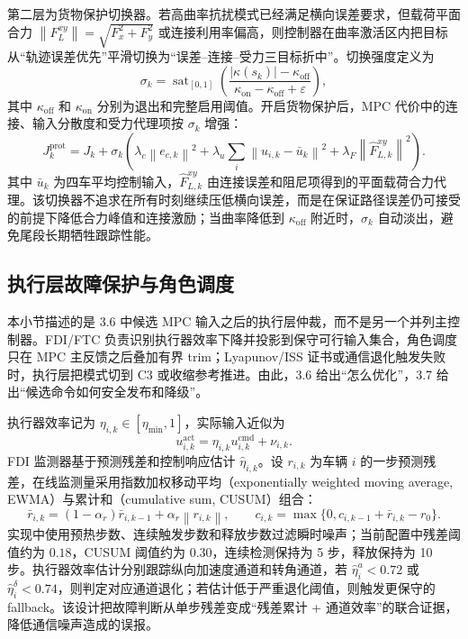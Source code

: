 \documentclass[twocolumn,3p,times,procedia]{elsarticle}
\newcommand{\norm}[1]{\left\lVert #1 \right\rVert}
\begin{document}
第二层为货物保护切换器。若高曲率抗扰模式已经满足横向误差要求，但载荷平面合力 $\norm{F_L^{xy}}=\sqrt{F_x^2+F_y^2}$ 或连接利用率偏高，则控制器在曲率激活区内把目标从“轨迹误差优先”平滑切换为“误差--连接--受力三目标折中”。切换强度定义为
\begin{equation}
\sigma_k=\operatorname{sat}_{[0,1]}\!\left(
\frac{|\kappa(s_k)|-\kappa_{\mathrm{off}}}
{\kappa_{\mathrm{on}}-\kappa_{\mathrm{off}}+\varepsilon}
\right),
\label{eq:payload_protection_switch}
\end{equation}
其中 $\kappa_{\mathrm{off}}$ 和 $\kappa_{\mathrm{on}}$ 分别为退出和完整启用阈值。开启货物保护后，MPC 代价中的连接、输入分散度和受力代理项按 $\sigma_k$ 增强：
\begin{equation}
J_k^{\mathrm{prot}}=J_k+
\sigma_k\!\left(
\lambda_c\norm{e_{c,k}}^2+
\lambda_u\sum_i\norm{u_{i,k}-\bar u_k}^2+
\lambda_F\norm{\hat F_{L,k}^{xy}}^2
\right).
\label{eq:payload_protection_cost}
\end{equation}
其中 $\bar u_k$ 为四车平均控制输入，$\hat F_{L,k}^{xy}$ 由连接误差和阻尼项得到的平面载荷合力代理。该切换器不追求在所有时刻继续压低横向误差，而是在保证路径误差仍可接受的前提下降低合力峰值和连接激励；当曲率降低到 $\kappa_{\mathrm{off}}$ 附近时，$\sigma_k$ 自动淡出，避免尾段长期牺牲跟踪性能。

\subsection{执行层故障保护与角色调度}

本小节描述的是 3.6 中候选 MPC 输入之后的执行层仲裁，而不是另一个并列主控制器。FDI/FTC 负责识别执行器效率下降并投影到保守可行输入集合，角色调度只在 MPC 主反馈之后叠加有界 trim；Lyapunov/ISS 证书或通信退化触发失败时，执行层把模式切到 C3 或收缩参考推进。由此，3.6 给出“怎么优化”，3.7 给出“候选命令如何安全发布和降级”。

执行器效率记为 $\eta_{i,k}\in[\eta_{\min},1]$，实际输入近似为
\begin{equation}
u_{i,k}^{\mathrm{act}}=\eta_{i,k}u_{i,k}^{\mathrm{cmd}}+\nu_{i,k}.
\label{eq:actuator_efficiency}
\end{equation}
FDI 监测器基于预测残差和控制响应估计 $\hat\eta_{i,k}$。设 $r_{i,k}$ 为车辆 $i$ 的一步预测残差，在线监测量采用指数加权移动平均（exponentially weighted moving average, EWMA）与累计和（cumulative sum, CUSUM）组合：
\begin{equation}
\bar r_{i,k}=(1-\alpha_r)\bar r_{i,k-1}+\alpha_r\norm{r_{i,k}},\qquad
c_{i,k}=\max\{0,c_{i,k-1}+\bar r_{i,k}-r_0\}.
\label{eq:fdi_ewma_cusum}
\end{equation}
实现中使用预热步数、连续触发步数和释放步数过滤瞬时噪声；当前配置中残差阈值约为 $0.18$，CUSUM 阈值约为 $0.30$，连续检测保持为 5 步，释放保持为 10 步。执行器效率估计分别跟踪纵向加速度通道和转角通道，若 $\hat\eta^a_i<0.72$ 或 $\hat\eta^\delta_i<0.74$，则判定对应通道退化；若估计低于严重退化阈值，则触发更保守的 fallback。该设计把故障判断从单步残差变成“残差累计 + 通道效率”的联合证据，降低通信噪声造成的误报。
\end{document}
